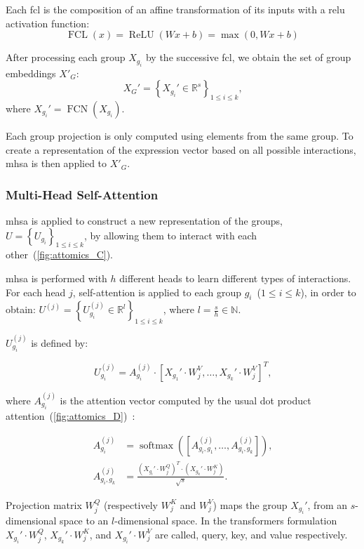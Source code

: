 \documentclass[../main.tex]{subfiles}
\begin{document}
		 Each \gls{fcl} is the composition of an affine transformation of its inputs with a \gls{relu} activation function:
		 \[ \operatorname{FCL}\left(x\right) = \operatorname{ReLU}\left(Wx+b \right) = \max\left(0, Wx+b\right) \]

		 After processing each group $X_{g_i}$ by the successive \gls{fcl}, we obtain the set of group embeddings $X'_G$:
		 \[ X_G' = \left\{ X_{g_i}' \in \mathbb{R}^{s}\right\}_{1 \leq i \leq k} \text{,} \]
		 where $X_{g_i}' = \operatorname{FCN}\left(X_{g_i}\right)$.

		 Each group projection is only computed using elements from the same group.
		 To create a representation of the expression vector based on all possible interactions, \gls{mhsa} is then applied to $X'_G$.

	 \subsubsection{Multi-Head Self-Attention}

		 \Gls{mhsa} is applied to construct a new representation of the groups, \(U = \left\{ U_{g_i}\right\}_{1 \leq i \leq k}\), by allowing them to interact with each other~(\cref{fig:attomics_C}).

		 \Gls{mhsa} is performed with $h$ different heads to learn different types of interactions.
		 For each head $j$, self-attention is applied to each group $g_i$~($1 \leq i \leq k $), in order to obtain: $U^{(j)} = \left\{ U^{(j)}_{g_i} \in \mathbb{R}^{l} \right\}_{1 \leq i \leq k}$, where $l = \frac{s}{h} \in \mathbb{N}$.

		 $U^{(j)}_{g_i}$ is defined by:

		 \[ U^{(j)}_{g_i} = A^{(j)}_{g_i} \cdot \left[ X_{g_1}' \cdot W_j^V, \ldots ,  X_{g_k}' \cdot W_j^V\right]^T \text{,}\]

		 where $A^{(j)}_{g_i}$ is the attention vector computed by the usual dot product attention~(\cref{fig:attomics_D})~\cite{vaswaniAttentionAllYou2017}:

		 \begin{align*}
			 A^{(j)}_{g_i}      & = \operatorname{softmax}\left(\left[A^{(j)}_{g_i,g_1}, \ldots,  A^{(j)}_{g_i,g_k}\right]\right) \text{,}  \\
			 A^{(j)}_{g_i, g_k} & =  \frac{\left(X_{g_i}' \cdot W_j^Q\right)^T \cdot \left(X_{g_k}' \cdot W_j^K \right)}{\sqrt{s}} \text{.}
		 \end{align*}

		 Projection matrix $W^Q_j$ (respectively $W^K_j$ and $W^V_j$) maps the group $X_{g_i}'$, from an $s$-dimensional space to an $l$-dimensional space.
		 In the transformers formulation $X_{g_i}' \cdot W_j^Q$, $X_{g_k}' \cdot W^K_j$, and $X_{g_i}' \cdot W^V_j$ are called, query, key, and value respectively.
\end{document}
